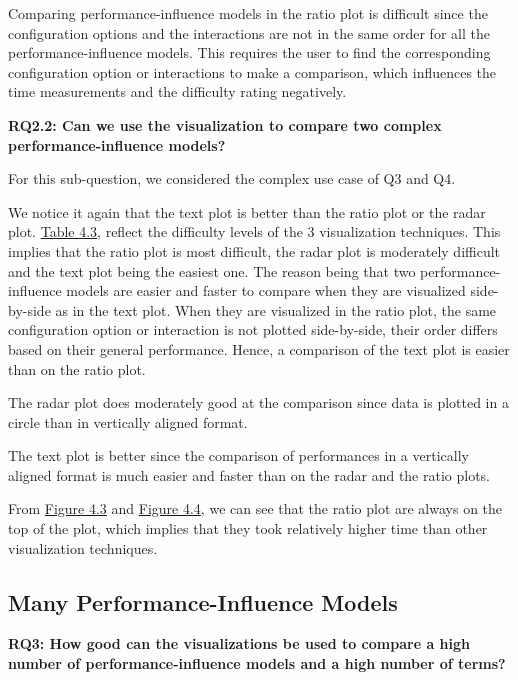 Comparing performance-influence models in the ratio plot is difficult since the configuration options and the interactions are not in the same order for all the performance-influence models. This requires the user to find the corresponding configuration option or interactions to make a comparison, which influences the time measurements and the difficulty rating negatively.

\vskip 0.2in
\begin{mdframed}
\textbf{RQ2.2: Can we use the visualization to compare two complex performance-influence models?}
\end{mdframed}

For this sub-question, we considered the complex use case of Q3 and Q4.

We notice it again that the text plot is better than the ratio plot or the radar plot. \hyperref[table:rating]{Table 4.3}, reflect the difficulty levels of the 3 visualization techniques. This implies that the ratio plot is most difficult, the radar plot is moderately difficult and the text plot being the easiest one. The reason being that two performance-influence models are easier and faster to compare when they are visualized side-by-side as in the text plot. When they are visualized in the ratio plot, the same configuration option or interaction is not plotted side-by-side, their order differs based on their general performance. Hence, a comparison of the text plot is easier than on the ratio plot. 

The radar plot does moderately good at the comparison since data is plotted in a circle than in vertically aligned format.

The text plot is better since the comparison of performances in a vertically aligned format is much easier and faster than on the radar and the ratio plots.


From \hyperref[figure:paretoTwoQ3]{Figure 4.3} and \hyperref[figure:paretoTwoQ4]{Figure 4.4}, we can see that the ratio plot are always on the top of the plot, which implies that they took relatively higher time than other visualization techniques.

\subsection*{Many Performance-Influence Models}

\vskip 0.2in
\begin{mdframed}
\textbf{RQ3: How good can the visualizations be used to compare a high number of performance-influence models and a high number of terms?}
\end{mdframed}

